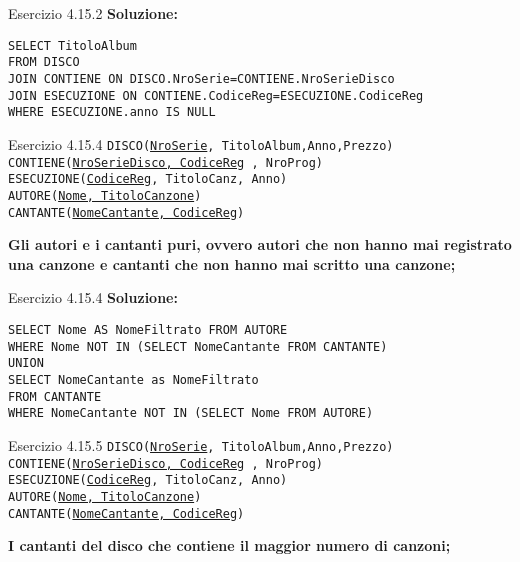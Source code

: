 \begin{frame}{Esercizio 4.15.2}
    \textbf{Soluzione:}
    \vspace{1em}
    
    \texttt{SELECT TitoloAlbum\\FROM DISCO\\JOIN CONTIENE ON DISCO.NroSerie=CONTIENE.NroSerieDisco
\\JOIN ESECUZIONE ON
CONTIENE.CodiceReg=ESECUZIONE.CodiceReg \\WHERE ESECUZIONE.anno IS NULL}
    \end{frame}
\begin{frame}{Esercizio 4.15.4}
    \texttt{DISCO(\underline{NroSerie}, TitoloAlbum,Anno,Prezzo)\\
    CONTIENE(\underline{NroSerieDisco, CodiceReg} , NroProg)\\
    ESECUZIONE(\underline{CodiceReg}, TitoloCanz, Anno)\\
    AUTORE(\underline{Nome, TitoloCanzone})\\
    CANTANTE(\underline{NomeCantante, CodiceReg})}
    \vspace{1em}
    
    \textbf{Gli autori e i cantanti puri, ovvero autori che non hanno mai registrato una canzone e cantanti che non hanno mai scritto una canzone;}
\end{frame}

\begin{frame}{Esercizio 4.15.4}
    \textbf{Soluzione:}
    \vspace{1em}
    
    \texttt{SELECT Nome AS NomeFiltrato FROM AUTORE\\WHERE Nome NOT IN (SELECT NomeCantante
FROM CANTANTE)\\
UNION\\
SELECT NomeCantante as NomeFiltrato\\FROM CANTANTE\\WHERE NomeCantante NOT IN (SELECT Nome FROM AUTORE)}
    \end{frame}
\begin{frame}{Esercizio 4.15.5}
    \texttt{DISCO(\underline{NroSerie}, TitoloAlbum,Anno,Prezzo)\\
    CONTIENE(\underline{NroSerieDisco, CodiceReg} , NroProg)\\
    ESECUZIONE(\underline{CodiceReg}, TitoloCanz, Anno)\\
    AUTORE(\underline{Nome, TitoloCanzone})\\
    CANTANTE(\underline{NomeCantante, CodiceReg})}
    \vspace{1em}
    
    \textbf{I cantanti del disco che contiene il maggior numero di canzoni;}
\end{frame}

